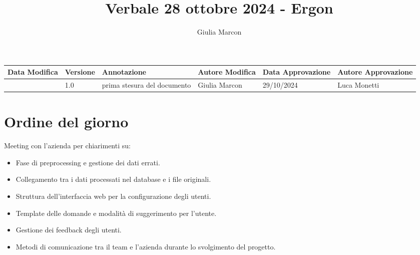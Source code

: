 \documentclass{TWReport}
\title{Verbale 28 ottobre 2024 - Ergon}
\author{Giulia Marcon}
\begin{document}
\frontmatter

\showPartecipants

 \begin{table}[h]
  \centering
  \renewcommand{\arraystretch}{1.5}
        \begin{tabularx}{\textwidth}{|>{\centering\arraybackslash}X|>{\centering\arraybackslash}X|>{\centering\arraybackslash}X|>{\centering\arraybackslash}X|>{\centering\arraybackslash}X|>{\centering\arraybackslash}X|}
        \hline
        \textbf{Data Modifica} & \textbf{Versione} & \textbf{Annotazione} & \textbf{Autore Modifica} & \textbf{Data Approvazione} & \textbf{Autore Approvazione} \\
        \hline
        {28/10/2024} & {1.0} & {prima stesura del documento} & {Giulia Marcon} & {29/10/2024} & {Luca Monetti} \\
        \hline
    \end{tabularx}
\end{table}

\section*{Ordine del giorno}
Meeting con l'azienda per chiarimenti su:
\begin{itemize}
    \item Fase di preprocessing e gestione dei dati errati.
    \item Collegamento tra i dati processati nel database e i file originali.
    \item Struttura dell'interfaccia web per la configurazione degli utenti.
    \item Template delle domande e modalità di suggerimento per l’utente.
    \item Gestione dei feedback degli utenti.
    \item Metodi di comunicazione tra il team e l'azienda durante lo svolgimento del progetto.
\end{itemize}
\end{document}
